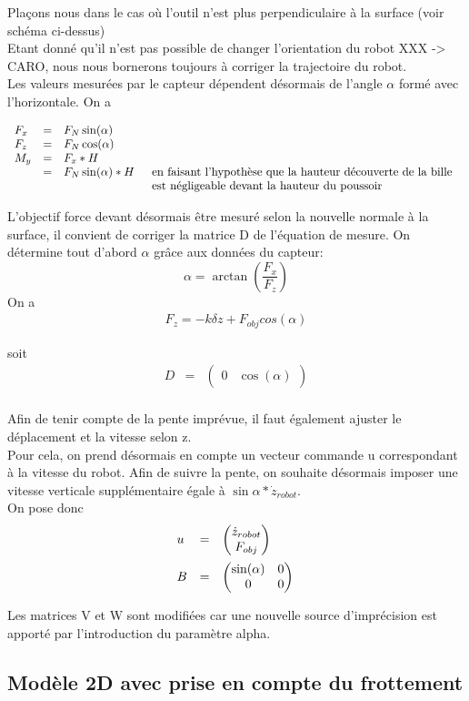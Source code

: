 \documentclass[12pt,twoside,a4paper]{article}
\begin{document}
\vspace{1cm}
Plaçons nous dans le cas où l'outil n'est plus perpendiculaire à la surface (voir schéma ci-dessus)\\

Etant donné qu'il n'est pas possible de changer l'orientation du robot XXX -> CARO, nous nous bornerons toujours à corriger la trajectoire du robot. \\

\vspace{1cm}
Les valeurs mesurées par le capteur dépendent désormais de l'angle $\alpha$ formé avec l'horizontale. On a 

$$
\begin{array}{llll}
F_x &=& F_N \sin(\alpha) &\\
F_z &=& F_N \cos(\alpha) &\\
M_y &= &F_x*H &\\
	&= &F_N \sin(\alpha)*H &
	\begin{array}[t]{l}
	\text{en faisant l'hypothèse que la hauteur découverte de la bille} \\ 
	\text{est négligeable devant la hauteur du poussoir}
	\end{array}
\end{array}
$$

L'objectif force devant désormais être mesuré selon la nouvelle normale à la surface, il convient de corriger la matrice D de l'équation de mesure.
On détermine tout d'abord $\alpha$ grâce aux données du capteur:
$$ \alpha = \arctan(\frac{F_{x}}{F_{z}}) $$
On a 
$$
\begin{array}{lll}
F_{z} = -k \delta z + F_{obj} cos(\alpha)
\end{array}
$$

soit 
$$
\begin{array}{lll}
D &=& \begin{pmatrix} 0 & \cos(\alpha) \end{pmatrix} \\ 
\end{array}
$$

Afin de tenir compte de la pente imprévue, il faut également ajuster le déplacement et la vitesse selon z. \\
Pour cela, on prend désormais en compte un vecteur commande u correspondant à la vitesse du robot. Afin de suivre la pente, on souhaite désormais imposer une vitesse verticale supplémentaire égale à $\sin{\alpha}*\dot{z}_{robot}$. \\
On pose donc
$$ 
\begin{array}{lll}
u &=& \begin{pmatrix} \dot{z}_{robot} \\ F_{obj}\end{pmatrix} \\
B &=& \begin{pmatrix}	\sin(\alpha) & 0 \\ 0 & 0  \end{pmatrix} \rule{0pt}{20pt}\\
\end{array}
$$



\noindent Les matrices V et W sont modifiées car une nouvelle source d'imprécision est apporté par l'introduction du paramètre alpha. 


\subsection{Modèle 2D avec prise en compte du frottement}
\end{document}
